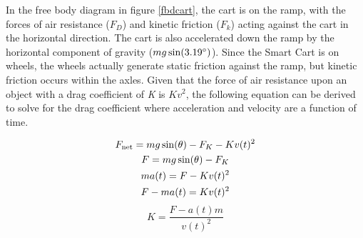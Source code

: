 In the free body diagram in figure \ref{fbdcart}, the cart is on the ramp, with the forces of air resistance ($F_{D}$) and kinetic friction ($F_{k}$) acting
against the cart in the horizontal direction. The cart is also accelerated down the ramp by the horizontal component of gravity ($mg\sin(3.19\degree)$).
Since the Smart Cart is on wheels, the wheels actually generate static friction against the ramp, but kinetic friction occurs within the axles.
Given that the force of air resistance upon an object with a drag coefficient of \textit{K} is $Kv^2$, the following equation can be derived to solve for the
drag coefficient where acceleration and velocity are a function of time. 

\begin{gather*}
  F_{\textup{net}} = mg\sin(\theta) - F_{K} - Kv(t)^2\\
  F = mg\sin(\theta) - F_{K} \\
  ma(t) = F - Kv(t)^2\\
  F - ma(t) = Kv(t)^2
\end{gather*}
\begin{equation}
  K = \frac{F-a(t)m}{v(t)^2}
  \label{Eq:K}
\end{equation}


